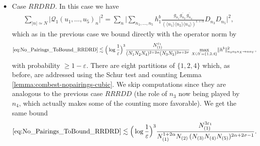 \documentclass[11pt, xcolor = dvipsnames,reqno
]{amsart}
\theoremstyle{definition}
\theoremstyle{remark}
\begin{document}
\begin{itemize}
\begin{enumerate}
    \item Since $\lVert h^b_1 \rVert_{n_4n_5 \to nn_1n_2n_3}^2 \lesssim \operatorname{min}_{\{4,5\}}  \cdot \operatorname{max}_{\{1,2,3\}} \operatorname{mid}_{\{1,2,3\}}^{1+\varepsilon_1} \operatorname{min}_{\{1,2,3\}}^2$, we get 
    \begin{align}
        \eqref{eq:No_Pairings_ToBound_RRRDD}
        & \lesssim 
        \frac{ N_{(1)}^{2\varepsilon_1} \operatorname{min}_{\{1,2,3\}} }{(N_1 N_2 N_3)^{1 + 2\alpha} \max_{\{4,5\}}(N_4N_5)^{2\alpha + 2\sigma - 1}}
        \\
        & = \frac{ N_{(1)}^{2\varepsilon_1} }{(N_{(1)} \max(\min_{\{1,2\}}, N_3))^{1 + 2\alpha} \max_{\{4,5\}} (N_4N_5)^{2\alpha + 2\sigma - 1}}, 
    \end{align}
    and observe that $\max(\min_{\{1,2\}}, N_3) \max_{\{4,5\}}$ contains $N_{(2)}$ too. 
\end{enumerate}
\hfill \break
In all cases, with probability $\geq 1 - \varepsilon$ we get at least the bound 
\begin{equation}
    \eqref{eq:No_Pairings_ToBound_RRRDD}
        \lesssim \Big(\log \frac{1}{\varepsilon} \Big)^3 \frac{N_{(1)}^{3\varepsilon_1}}{N_{(1)}^{1+2\alpha} N_{(2)} \, (N_{(3)}N_{(4)}N_{(5)})^{2\alpha + 2\sigma - 1}}.
\end{equation}
\item Case $RRDRD$.  In this case we have
\begin{align}\label{eq:No_Pairings_ToBound_RRDRD}
    \sum_{|n| \simeq N}  \big| \mathcal{Q}_1(u_1, \ldots, u_5)_n \big|^2
    = \sum_n 
    \Bigg| \sum_{n_1, \ldots, n_5 } h^b_1 
    \frac{g_{n_1} \overline{g_{n_2}} \, \overline{g_{n_4}}}{ (\langle n_1 \rangle \langle n_2 \rangle\langle n_4 \rangle)^{1+\alpha}} D_{n_3} D_{n_5} \Bigg|^2,
\end{align}
which as in the previous case we bound directly with the operator norm by
\begin{align}
    \eqref{eq:No_Pairings_ToBound_RRDRD}
    \lesssim \Big(\log \frac{1}{\varepsilon} \Big)^3
    \frac{N_{(1)}^{\varepsilon_1}}{(N_1N_2N_4)^{2 + 2\alpha} (N_3N_5)^{2\alpha + 2\sigma}} \, 
    \max_{X \dot\cup Y = \{1,2,4\} } \lVert h^b \rVert_{n_3n_5n_X \to nn_Y}^2, 
\end{align}
with probability $\geq 1 - \varepsilon$.
There are eight partitions of $\{1,2,4\}$ which, as before, are addressed using the Schur test and counting Lemma \ref{lemma:combest-nopairings-cubic}. 
We skip computations since they are analogous to the previous case $RRRDD$ (the role of $n_3$  now being played by $n_4$, which actually makes some of the counting more favorable).
We get the same bound
\begin{equation}
    \eqref{eq:No_Pairings_ToBound_RRDRD}
        \lesssim \Big(\log \frac{1}{\varepsilon} \Big)^3 \frac{N_{(1)}^{3\varepsilon_1}}{N_{(1)}^{1+2\alpha} N_{(2)} \, (N_{(3)} N_{(4)} N_{(5)})^{2\alpha + 2\sigma - 1}}. 
\end{equation}



\end{itemize}
\end{document}
